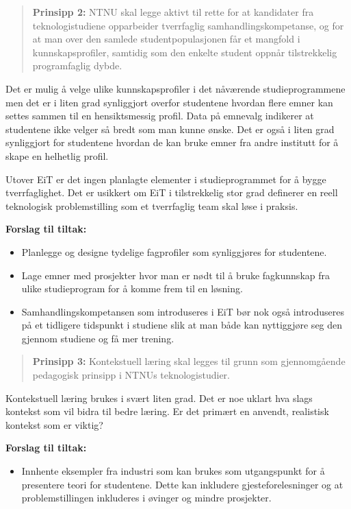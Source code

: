 \begin{quote}
	\textbf{Prinsipp 2:} NTNU skal legge aktivt til rette for at kandidater fra teknologistudiene opparbeider tverrfaglig samhandlingskompetanse, og for at man over den samlede studentpopulasjonen får et mangfold i kunnskapsprofiler, samtidig som den enkelte student oppnår tilstrekkelig programfaglig dybde.
\end{quote}

Det er mulig å velge ulike kunnskapsprofiler i det nåværende studieprogrammene men det er i liten grad synliggjort overfor studentene hvordan flere emner kan settes sammen til en hensiktsmessig profil. Data på emnevalg indikerer at studentene ikke velger så bredt som man kunne ønske. Det er også i liten grad synliggjort for studentene hvordan de kan bruke emner fra andre institutt for å skape en helhetlig profil.

Utover EiT er det ingen planlagte elementer i studieprogrammet for å bygge tverrfaglighet. Det er usikkert om EiT i tilstrekkelig stor grad definerer en reell teknologisk problemstilling som et tverrfaglig team skal løse i praksis. 

\textbf{Forslag til tiltak:}

\begin{itemize}
    \item Planlegge og designe tydelige fagprofiler som synliggjøres for studentene.
	\item Lage emner med prosjekter hvor man er nødt til å bruke fagkunnskap fra ulike studieprogram for å komme frem til en løsning.
	\item Samhandlingskompetansen som introduseres i EiT bør nok også introduseres på et tidligere tidspunkt i studiene slik at man både kan nyttiggjøre seg den gjennom studiene og få mer trening.
\end{itemize}

\begin{quote}
	\textbf{Prinsipp 3:} Kontekstuell læring skal legges til grunn som gjennomgående pedagogisk prinsipp i NTNUs teknologistudier.
\end{quote}

Kontekstuell læring brukes i svært liten grad. Det er noe uklart hva slags kontekst som vil bidra til bedre læring. Er det primært en anvendt, realistisk kontekst som er viktig?

\textbf{Forslag til tiltak:}

\begin{itemize}
    \item Innhente eksempler fra industri som kan brukes som utgangspunkt for å presentere teori for studentene. Dette kan inkludere gjesteforelesninger og at problemstillingen inkluderes i øvinger og mindre prosjekter.
\end{itemize}

